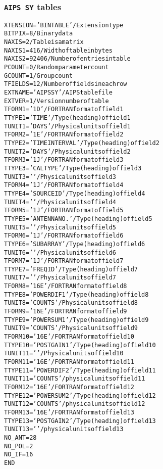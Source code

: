\documentclass[twoside]{article}
\newcommand{\Hi}[1]{\textcolor{hicol}{#1}}
\begin{document}
\subsubsection{{\tt AIPS SY} tables}
\label{Appe:SYtable}
\begin{alltt}
XTENSION= 'BINTABLE'           / Extension type
BITPIX  =                    8 / Binary data
NAXIS   =                    2 / Table is a matrix
NAXIS1  =                 \Hi{416} / Width of table in bytes
NAXIS2  =                92406 / Number of entries in table
PCOUNT  =                    0 / Random parameter count
GCOUNT  =                    1 / Group count
TFIELDS =                   12 / Number of fields in each row
EXTNAME = 'AIPS SY '           / AIPS table file
EXTVER  =                    1 / Version number of table
TFORM1  = '1D      '           / FORTRAN format of field  1
TTYPE1  = 'TIME            '   / Type (heading) of field  1
TUNIT1  = 'DAYS    '           / Physical units of field  1
TFORM2  = '1E      '           / FORTRAN format of field  2
TTYPE2  = 'TIME INTERVAL   '   / Type (heading) of field  2
TUNIT2  = 'DAYS    '           / Physical units of field  2
\Hi{TFORM3  = '1J      '           / FORTRAN format of field  3
TTYPE3  = 'CAL TYPE        '   / Type (heading) of field  3
TUNIT3  = '        '           / Physical units of field  3}
TFORM4  = '1J      '           / FORTRAN format of field  4
TTYPE4  = 'SOURCE ID       '   / Type (heading) of field  4
TUNIT4  = '        '           / Physical units of field  4
TFORM5  = '1J      '           / FORTRAN format of field  5
TTYPE5  = 'ANTENNA NO.     '   / Type (heading) of field  5
TUNIT5  = '        '           / Physical units of field  5
TFORM6  = '1J      '           / FORTRAN format of field  6
TTYPE6  = 'SUBARRAY        '   / Type (heading) of field  6
TUNIT6  = '        '           / Physical units of field  6
TFORM7  = '1J      '           / FORTRAN format of field  7
TTYPE7  = 'FREQ ID         '   / Type (heading) of field  7
TUNIT7  = '        '           / Physical units of field  7
TFORM8  = '16E     '           / FORTRAN format of field  8
TTYPE8  = 'POWER DIF1      '   / Type (heading) of field  8
TUNIT8  = 'COUNTS  '           / Physical units of field  8
TFORM9  = '16E     '           / FORTRAN format of field  9
TTYPE9  = 'POWER SUM1      '   / Type (heading) of field  9
TUNIT9  = 'COUNTS  '           / Physical units of field  9
TFORM10 = '16E     '           / FORTRAN format of field 10
TTYPE10 = 'POST GAIN1      '   / Type (heading) of field 10
TUNIT11 = '        '           / Physical units of field 10
TFORM11 = '16E     '           / FORTRAN format of field 11
TTYPE11 = 'POWER DIF2      '   / Type (heading) of field 11
TUNIT11 = 'COUNTS  '           / physical units of field 11
TFORM12 = '16E     '           / FORTRAN format of field 12
TTYPE12 = 'POWER SUM2      '   / Type (heading) of field 12
TUNIT12 = 'COUNTS  '           / physical units of field 12
TFORM13 = '16E     '           / FORTRAN format of field 13
TTYPE13 = 'POST GAIN2      '   / Type (heading) of field 13
TUNIT13 = '        '           / physical units of field 13
NO_ANT  =           28
NO_POL  =            2
NO_IF   =           16
END
\end{alltt}
\end{document}

